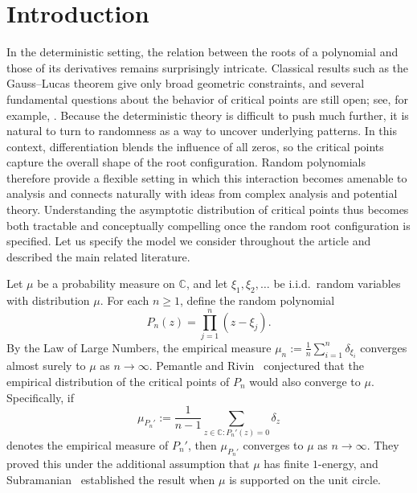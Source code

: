 \documentclass[12pt, reqno]{amsart}
\theoremstyle{plain}
\theoremstyle{definition}
\begin{document}
 
 
 \section{Introduction}
 In the deterministic setting, the relation between the roots of a polynomial and those of its derivatives remains surprisingly intricate. Classical results such as the Gauss–Lucas theorem give only broad geometric constraints, and several fundamental questions about the behavior of critical points are still open; see, for example, \cite{Tao22, GLSv07}. Because the deterministic theory is difficult to push much further, it is natural to turn to randomness as a way to uncover underlying patterns. In this context, differentiation blends the influence of all zeros, so the critical points capture the overall shape of the root configuration. Random polynomials therefore provide a flexible setting in which this interaction becomes amenable to analysis and connects naturally with ideas from complex analysis and potential theory. Understanding the asymptotic distribution of critical points thus becomes both tractable and conceptually compelling once the random root configuration is specified. Let us specify the model we consider throughout the article and described the main related literature.
 
 Let $\mu$ be a probability measure on $\mathbb{C}$, and let $\xi_1, \xi_2, \ldots$ be i.i.d.\ random variables with distribution $\mu$.  
 For each $n \geq 1$, define the random polynomial
 \[
 P_n(z) = \prod_{j=1}^n (z - \xi_j).
 \]
 By the Law of Large Numbers, the empirical measure $\mu_n:=\frac1n \sum_{i=1}^{n} \delta_{\xi_i}$ converges almost surely to $\mu$ as $n \to \infty$. Pemantle and Rivin~\cite{pemantle2013distribution} conjectured that the empirical distribution of the critical points of $P_n$ would also converge to $\mu$.  
 Specifically, if
 \[
 \mu_{P_n'} := \frac{1}{n-1} \sum_{z \in \mathbb{C} : P_n'(z) = 0} \delta_z
 \]
 denotes the empirical measure of $P_n'$, then $\mu_{P_n'}$ converges to $\mu$ as $n \to \infty$.  
 They proved this under the additional assumption that $\mu$ has finite $1$-energy, and Subramanian~\cite{subramanian2012distribution} established the result when $\mu$ is supported on the unit circle.  
 
\end{document}
